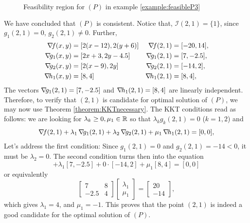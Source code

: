 \begin{example}
\begin{figure}[ht!]
\caption{Feasibility region for $(P)$ in example \ref{example:feasibleP3}}
\label{figure:feasibleP3}
\end{figure}
We have concluded that $(P)$ is consistent.  Notice that, $\mathcal{I}(2,1) = \{ 1 \}$, since $g_1(2,1) = 0$, $g_2(2,1) \neq 0$.  Further,
\begin{align*}
\gradient{f}(x,y)   &= [ 2(x-12), 2(y+6) ] &\gradient{f}(2,1)   &= [-20, 14], \\
\gradient{g_1}(x,y) &= [ 2x+3, 2y-4.5 ]    &\gradient{g_1}(2,1) &= [  7, -2.5], \\
\gradient{g_2}(x,y) &= [ 2(x-9), 2y ]      &\gradient{g_2}(2,1) &= [-14, 2], \\
\gradient{h_1}(x,y) &= [ 8, 4]             &\gradient{h_1}(2,1) &= [  8, 4], 
\end{align*}
The vectors $\mathop{\nabla\! {g_1}}(2,1) = [7,-2.5]$ and $\mathop{\nabla\! {h_1}}(2,1)=[8,4]$ are linearly independent.  Therefore, to verify that $(2,1)$ is candidate for optimal solution of $(P)$, we may now use Theorem \ref{theorem:KKTnecessary}.  The KKT conditions read as follows: we are looking for $\lambda_k \geq 0, \mu_1 \in \mathbb{R}$ so that $\lambda_k g_k(2,1)=0$ ($k=1,2$) and
\begin{equation*}
\mathop{\nabla\! {f}}(2,1) + \lambda_1 \mathop{\nabla\! {g_1}}(2,1) + \lambda_2 \mathop{\nabla\! {g_2}}(2,1) + \mu_1 \mathop{\nabla\! {h_1}}(2,1) = [0,0], 
\end{equation*}
Let's address the first condition: Since $g_1(2,1)=0$ and $g_2(2,1)=-14<0$, it must be $\lambda_2=0$.  The second condition turns then into the equation
\begin{equation*}
[-20,14] + \lambda_1 [7,-2.5] + 0 \cdot [-14,2] + \mu_1 [8,4] = [0,0]
\end{equation*}
or equivalently
\begin{equation*}
\begin{bmatrix} 7 & 8 \\ -2.5 & 4 \end{bmatrix} \begin{bmatrix} \lambda_1 \\ \mu_1 \end{bmatrix} = \begin{bmatrix} 20 \\ -14 \end{bmatrix},
\end{equation*}
which gives $\lambda_1=4$, and $\mu_1=-1$.  This proves that the point $(2,1)$ is indeed a good candidate for the optimal solution of $(P)$.
\end{example}

